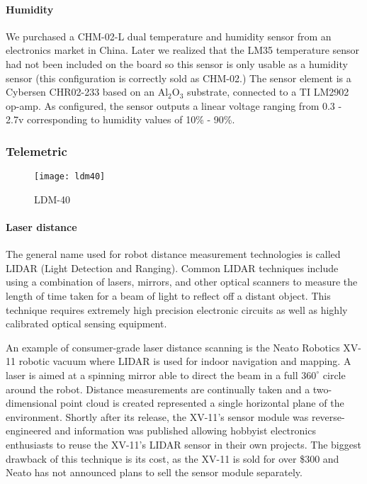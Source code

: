\documentclass[12pt]{article}
\newcommand{\brand}{}
\begin{document}
    \paragraph*{Humidity}
    We purchased a \brand{CHM-02-L} dual temperature and humidity sensor from an electronics market in China. Later we realized that the \brand{LM35} temperature sensor had not been included on the board so this sensor is only usable as a humidity sensor (this configuration is correctly sold as \brand{CHM-02}.) The sensor element is a \brand{Cybersen CHR02-233} based on an Al$_2$O$_3$ substrate, connected to a \brand{TI LM2902} op-amp. As configured, the sensor outputs a linear voltage ranging from 0.3 - 2.7v corresponding to humidity values of 10\% - 90\%. 

\subsubsection{Telemetric}

    \begin{wrapfigure}{l}{0.2\textwidth}
        \centering
        \texttt{[image: ldm40]}
        \caption*{LDM-40}
    \end{wrapfigure}
    \paragraph*{Laser distance}
    The general name used for robot distance measurement technologies is called LIDAR (Light Detection and Ranging). Common LIDAR techniques include using a combination of lasers, mirrors, and other optical scanners to measure the length of time taken for a beam of light to reflect off a distant object. This technique requires extremely high precision electronic circuits as well as highly calibrated optical sensing equipment.

    An example of consumer-grade laser distance scanning is the \brand{Neato Robotics XV-11} robotic vacuum where LIDAR is used for indoor navigation and mapping. A laser is aimed at a spinning mirror able to direct the beam in a full $360^\circ$ circle around the robot. Distance measurements are continually taken and a two-dimensional point cloud is created represented a single horizontal plane of the environment. Shortly after its release, the \brand{XV-11}'s sensor module was reverse-engineered and information was published allowing hobbyist electronics enthusiasts to reuse the \brand{XV-11}'s LIDAR sensor in their own projects. The biggest drawback of this technique is its cost, as the \brand{XV-11} is sold for over \$300 and \brand{Neato} has not announced plans to sell the sensor module separately.
\end{document}
